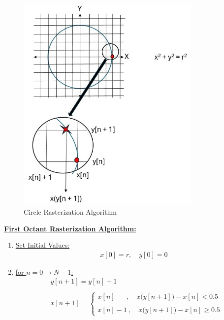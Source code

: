 \documentclass{article}
\begin{document}
\begin{figure}[ht!]
\centering
\includegraphics[width=90mm]{Circle Rasterization.jpg}
\caption{Circle Rasterization Algorithm \label{overflow}}
\end{figure}



\underline{\textbf{First Octant Rasterization Algorithm:}} \\
\begin{enumerate}
    \item \underline{Set Initial Values:} 
          \begin{align*}
                x[0] = r, \quad y[0] = 0 
            \end{align*}
    \item \underline{for $n = 0 \rightarrow N - 1$:} \\
          \begin{align*}
            &y[n + 1] = y[n] + 1 \\ \\
            &x[n + 1] = \begin{cases}
                            x[n] \quad \ \ \ , \quad x\Big(y[n + 1]\Big) - x[n] < 0.5 \\ \\
                            x[n] - 1 \ , \quad x\Big(y[n + 1]\Big) - x[n] \geq 0.5
                          \end{cases}
      \end{align*}
\end{enumerate}
\end{document}
